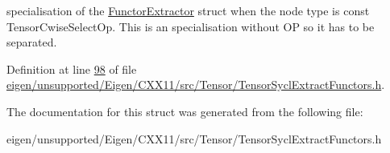 specialisation of the \hyperlink{struct_eigen_1_1_tensor_sycl_1_1internal_1_1_functor_extractor}{Functor\+Extractor} struct when the node type is const Tensor\+Cwise\+Select\+Op. This is an specialisation without OP so it has to be separated. 

Definition at line \hyperlink{eigen_2unsupported_2_eigen_2_c_x_x11_2src_2_tensor_2_tensor_sycl_extract_functors_8h_source_l00098}{98} of file \hyperlink{eigen_2unsupported_2_eigen_2_c_x_x11_2src_2_tensor_2_tensor_sycl_extract_functors_8h_source}{eigen/unsupported/\+Eigen/\+C\+X\+X11/src/\+Tensor/\+Tensor\+Sycl\+Extract\+Functors.\+h}.



The documentation for this struct was generated from the following file\+:\begin{DoxyCompactItemize}
\item 
eigen/unsupported/\+Eigen/\+C\+X\+X11/src/\+Tensor/\+Tensor\+Sycl\+Extract\+Functors.\+h\end{DoxyCompactItemize}
